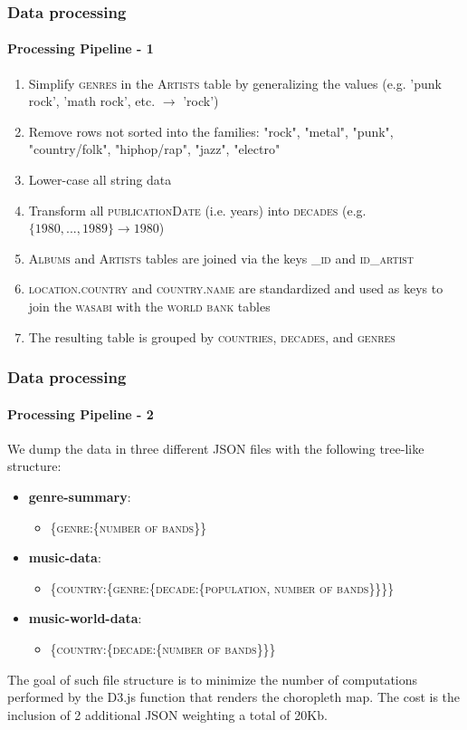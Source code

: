 \documentclass[aspectratio=43,10pt]{beamer}
\begin{document}
\begin{frame}
    \frametitle{Data processing}
    \framesubtitle{Processing Pipeline - 1}
    \small{
        \begin{enumerate}
            \item Simplify \textsc{genres} in the \textsc{Artists} table by generalizing the values (e.g. 'punk rock', 'math rock', etc. $\rightarrow$ 'rock')
            \item Remove rows not sorted into the families: "rock", "metal", "punk", "country/folk", "hiphop/rap", "jazz", "electro"
            \item Lower-case all string data
            \item Transform all \textsc{publicationDate} (i.e. years) into \textsc{decades} (e.g. $\{1980, ..., 1989\} \rightarrow 1980$)
            \item \textsc{Albums} and \textsc{Artists} tables are joined via the keys \textsc{\_id} and \textsc{id\_artist}
            \item \textsc{location.country} and \textsc{country.name} are standardized and used as keys to join the \textsc{wasabi} with the \textsc{world bank} tables
            \item The resulting table is grouped by \textsc{countries}, \textsc{decades}, and \textsc{genres}
        \end{enumerate}
    }
\end{frame}

\begin{frame}
    \frametitle{Data processing}
    \framesubtitle{Processing Pipeline - 2}
    \small{
        We dump the data in three different JSON files with the following tree-like structure:
        \begin{itemize}
            \item \textbf{genre-summary}: 
            \begin{itemize}
                \item \footnotesize{\{\textsc{genre}:\{\textsc{number of bands}\}\}}
            \end{itemize}
            \item \textbf{music-data}: 
            \begin{itemize}
                \item \footnotesize{\{\textsc{country}:\{\textsc{genre}:\{\textsc{decade}:\{\textsc{population},  \textsc{number of bands}\}\}\}\}}
            \end{itemize}
            \item \textbf{music-world-data}: 
            \begin{itemize}
                \item \footnotesize{\{\textsc{country}:\{\textsc{decade}:\{\textsc{number of bands}\}\}\}}
            \end{itemize}
        \end{itemize}
    The goal of such file structure is to minimize the number of computations performed by the D3.js function that renders the choropleth map. The cost is the inclusion of 2 additional JSON weighting a total of 20Kb. 
    }
\end{frame}
\end{document}
